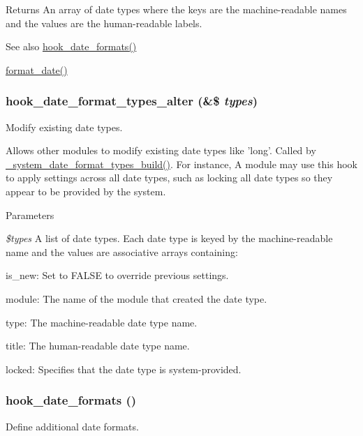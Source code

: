 \begin{DoxyReturn}{Returns}
An array of date types where the keys are the machine-\/readable names and the values are the human-\/readable labels.
\end{DoxyReturn}
\begin{DoxySeeAlso}{See also}
\hyperlink{group__hooks_ga2a190ba304193ab7752bfc489463a0d7}{hook\_\-date\_\-formats()} 

\hyperlink{group__format_ga40553742a67f9c79c4669b9053fe202c}{format\_\-date()} 
\end{DoxySeeAlso}
\hypertarget{group__hooks_ga22573783fb241b759f4e3e2c211d13bf}{
\subsubsection[{hook\_\-date\_\-format\_\-types\_\-alter}]{\setlength{\rightskip}{0pt plus 5cm}hook\_\-date\_\-format\_\-types\_\-alter (\&\$ {\em types})}}
\label{group__hooks_ga22573783fb241b759f4e3e2c211d13bf}
Modify existing date types.

Allows other modules to modify existing date types like 'long'. Called by \hyperlink{system_8module_aed8872b51fe912cbf8d4e966af237b66}{\_\-system\_\-date\_\-format\_\-types\_\-build()}. For instance, A module may use this hook to apply settings across all date types, such as locking all date types so they appear to be provided by the system.


\begin{DoxyParams}{Parameters}
\item[{\em \$types}]A list of date types. Each date type is keyed by the machine-\/readable name and the values are associative arrays containing:
\begin{DoxyItemize}
\item is\_\-new: Set to FALSE to override previous settings.
\item module: The name of the module that created the date type.
\item type: The machine-\/readable date type name.
\item title: The human-\/readable date type name.
\item locked: Specifies that the date type is system-\/provided. 
\end{DoxyItemize}\end{DoxyParams}
\hypertarget{group__hooks_ga2a190ba304193ab7752bfc489463a0d7}{
\subsubsection[{hook\_\-date\_\-formats}]{\setlength{\rightskip}{0pt plus 5cm}hook\_\-date\_\-formats ()}}
\label{group__hooks_ga2a190ba304193ab7752bfc489463a0d7}
Define additional date formats.

